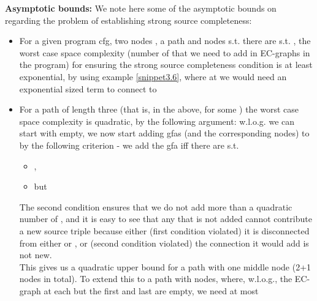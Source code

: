 \textbf{Asymptotic bounds:}
We note here some of the asymptotic bounds on regarding the problem of establishing strong source completeness:
\begin{itemize}
	\item For a given program cfg, two nodes , a path  and nodes  s.t. there are 
	 s.t. , the worst case space complexity (number of \gfas that we need to add in EC-graphs in the program) for ensuring the strong source completeness condition is at least exponential, by using example \ref{snippet3.6}, where at  we would need an exponential sized term to connect  to 
	\item For a path of length three (that is, in the above,  for some ) the worst case space complexity is quadratic, by the following argument: w.l.o.g. we can start with  empty, we now start adding gfas (and the corresponding nodes) to  by the following criterion - we add the gfa  iff there are  s.t.
		\begin{itemize}
			\item  {},
			\item {} but 
		\end{itemize}
		The second condition ensures that we do not add more than a quadratic number of \gfas, and it is easy to see that any \gfa that is not added cannot contribute a new source triple because either (first condition violated) it is disconnected from either  or , or (second condition violated) the connection it would add is not new.\\
		This gives us a quadratic upper bound for a path with one middle node (2+1 nodes in total). 
		To extend this to a path with  nodes,  where, w.l.o.g., the EC-graph at each but the first and last are empty, we need at most \m{













}
\end{itemize}
